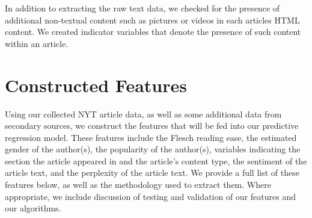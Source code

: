 \documentclass[fleqn,12pt]{SelfArx} %
\begin{document}
In addition to extracting the raw text data, we checked for the presence of additional non-textual content such as pictures or videos in each articles HTML content. We created indicator variables that denote the presence of such content within an article.

\section{Constructed Features}

Using our collected NYT article data, as well as some additional data from secondary sources, we construct the features that will be fed into our predictive regression model. These features include the Flesch reading ease, the estimated gender of the author(s), the popularity of the author(s), variables indicating the section the article appeared in and the article's content type, the sentiment of the article text, and the perplexity of the article text. We provide a full list of these features below, as well as the methodology used to extract them. Where appropriate, we include discussion of testing and validation of our features and our algorithms.
\end{document}
